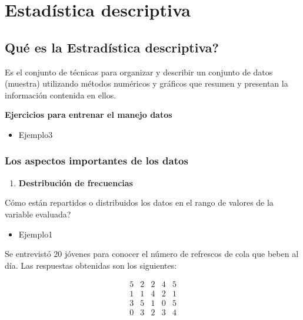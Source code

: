 \documentclass[
]{book}
\providecommand{\tightlist}{%
  \setlength{\itemsep}{0pt}\setlength{\parskip}{0pt}}
\theoremstyle{definition}
\theoremstyle{definition}
\theoremstyle{definition}
\theoremstyle{definition}
\theoremstyle{remark}
\begin{document}
\hypertarget{estaduxedstica-descriptiva}{%
\chapter{Estadística descriptiva}\label{estaduxedstica-descriptiva}}

\hypertarget{quuxe9-es-la-estraduxedstica-descriptiva}{%
\section{Qué es la Estradística descriptiva?}\label{quuxe9-es-la-estraduxedstica-descriptiva}}

Es el conjunto de técnicas para organizar y describir un conjunto de datos (muestra)
utilizando métodos numéricos y gráficos que resumen y presentan la información contenida
en ellos.

\textbf{Ejercicios para entrenar el manejo datos}

\begin{itemize}
\tightlist
\item
  Ejemplo3
\end{itemize}

\hypertarget{los-aspectos-importantes-de-los-datos}{%
\subsection{Los aspectos importantes de los datos}\label{los-aspectos-importantes-de-los-datos}}

\begin{enumerate}
\def\labelenumi{\arabic{enumi}.}
\tightlist
\item
  \textbf{Destribución de frecuencias}
\end{enumerate}

Cómo están repartidos o distribuidos los datos en el rango de valores de la variable evaluada?

\begin{itemize}
\tightlist
\item
  Ejemplo1
\end{itemize}

Se entrevistó 20 jóvenes para conocer el número de refrescos de cola que beben al día. Las respuestas obtenidas son los siguientes:

\begin{equation}
\begin{matrix}
5 & 2 & 2 & 4 & 5\\
1 & 1 & 4 & 2 & 1\\
3 & 5 & 1 & 0 & 5\\ 
0 & 3 & 2 & 3 & 4
\end{matrix}
\end{equation}
\end{document}
